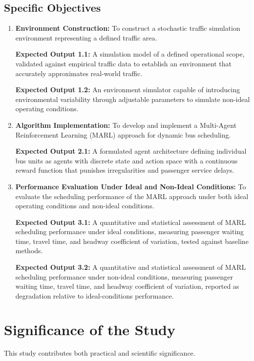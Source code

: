 \subsection{Specific Objectives}
\begin{enumerate}
   \item \textbf{Environment Construction:} To construct a stochastic traffic simulation environment representing a defined traffic area.

   \textbf{Expected Output 1.1:} A simulation model of a defined operational scope, validated against empirical traffic data to establish an environment that accurately approximates real-world traffic.

   \textbf{Expected Output 1.2:} An environment simulator capable of introducing environmental variability through adjustable parameters to simulate non-ideal operating conditions.

   \item \textbf{Algorithm Implementation:} To develop and implement a Multi-Agent Reinforcement Learning (MARL) approach for dynamic bus scheduling.

   \textbf{Expected Output 2.1:} A formulated agent architecture defining individual bus units as agents with discrete state and action space with a continuous reward function that punishes irregularities and passenger service delays.

   \item \textbf{Performance Evaluation Under Ideal and Non-Ideal Conditions:} To evaluate the scheduling performance of the MARL approach under both ideal operating conditions and non-ideal conditions.

   \textbf{Expected Output 3.1:} A quantitative and statistical assessment of MARL scheduling performance under ideal conditions, measuring passenger waiting time, travel time, and headway coefficient of variation, tested against baseline methods.

   \textbf{Expected Output 3.2:} A quantitative and statistical assessment of MARL scheduling performance under non-ideal conditions, measuring passenger waiting time, travel time, and headway coefficient of variation, reported as degradation relative to ideal-conditions performance.
\end{enumerate}


\section{Significance of the Study}
This study contributes both practical and scientific significance.
 
